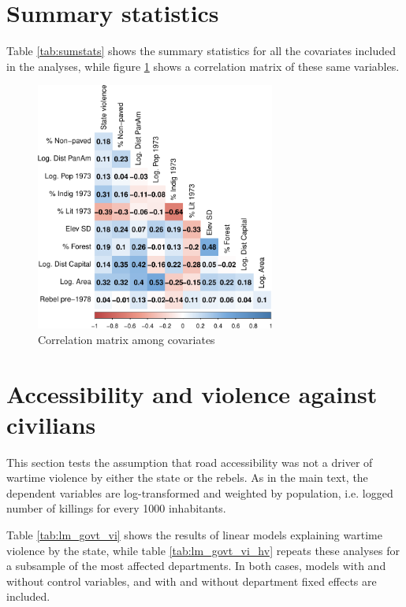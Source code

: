 \documentclass[a4paper, 12pt, notitlepage]{article}
\begin{document}
\clearpage
\section{Summary statistics}\label{app:stats}

Table \ref{tab:sumstats} shows the summary statistics for all the covariates included in the analyses, while figure \ref{fig:corrplot} shows a correlation matrix of these same variables.



\begin{figure}[htb!]
  \centering
    \includegraphics[width = 0.7\textwidth]{img/corrplot}

  \caption{Correlation matrix among covariates} \label{fig:corrplot}

\end{figure}

\clearpage
\section{Accessibility and violence against civilians}\label{app:lm_violence}

This section tests the assumption that road accessibility was not a driver of wartime violence by either the state or the rebels.
As in the main text, the dependent variables are log-transformed and weighted by population, i.e. logged number of killings for every 1000 inhabitants.

Table \ref{tab:lm_govt_vi} shows the results of linear models explaining wartime violence by the state, while table \ref{tab:lm_govt_vi_hv} repeats these analyses for a subsample of the most affected departments.
In both cases, models with and without control variables, and with and without department fixed effects are included.
\end{document}
